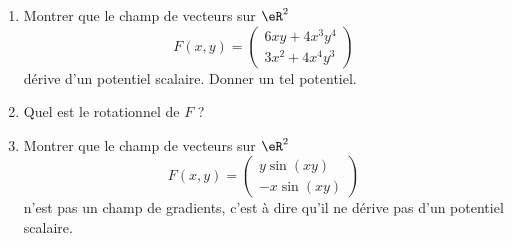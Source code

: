 
\begin{exercice}\label{exoOutilsMath-0097}

    \begin{enumerate}
        \item
            Montrer que le champ de vecteurs sur $\eR^2$
            \begin{equation}
                F(x,y)=\begin{pmatrix}
                    6xy+4x^3y^4    \\ 
                    3x^2+4x^4y^3    
                \end{pmatrix}
            \end{equation}
            dérive d'un potentiel scalaire. Donner un tel potentiel.
        \item
            Quel est le rotationnel de $F$ ?
        \item
            Montrer que le champ de vecteurs sur $\eR^2$
            \begin{equation}
                F(x,y)=\begin{pmatrix}
                    y\sin(xy)    \\ 
                    -x\sin(xy)    
                \end{pmatrix}
            \end{equation}
            n'est pas un champ de gradients, c'est à dire qu'il ne dérive pas d'un potentiel scalaire.
    \end{enumerate}

\end{exercice}
